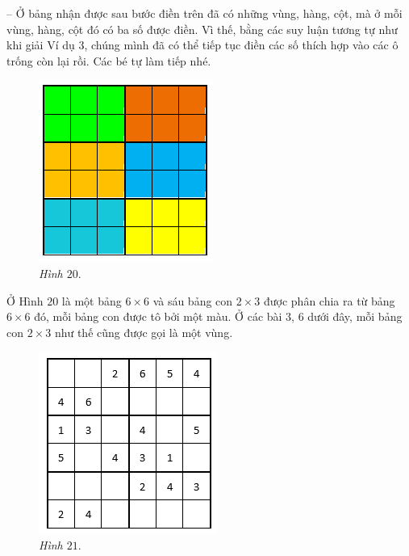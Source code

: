 	-- Ở bảng nhận được sau bước điền trên đã có những vùng, hàng, cột, mà ở mỗi vùng, hàng, cột đó có ba số được điền. Vì thế, bằng các suy luận tương tự như khi giải Ví dụ $3$, chúng mình đã có thể tiếp tục điền các số thích hợp vào các ô trống còn lại rồi. Các bé tự làm tiếp nhé.
	\vskip 0.1cm
	\begin{figure}
		\centering
		\vspace*{-30pt}
		\captionsetup{labelformat= empty, justification=centering}
		\includegraphics[scale=0.5]{pic9}
		\vspace*{-5pt}
		\caption{\small\textit{Hình $20.$}}
		\vspace*{-25pt}
	\end{figure}
		Ở Hình $20$ là một bảng $6\times6$ và sáu bảng con $2\times3$ được phân chia ra từ bảng $6\times6$ đó, mỗi bảng con được tô bởi một màu. Ở các bài $3$, $6$ dưới đây, mỗi bảng con $2\times3$ như thế cũng được gọi là một vùng.
		\vskip 0.1cm
		\begin{figure}
			\centering
			\vspace*{-25pt}
			\captionsetup{labelformat= empty, justification=centering}
			\includegraphics[scale=0.5]{pic10}
			\vspace*{-5pt}
			\caption{\small\textit{Hình $21.$}}
			\vspace*{-20pt}
		\end{figure}
